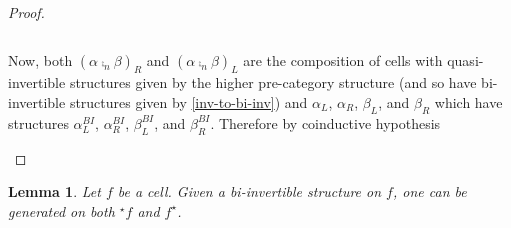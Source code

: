 \documentclass[draft]{article}
\newtheorem{lemma}[theorem]{Lemma} \theoremstyle{definition}
\newcommand{\linv}[1]{{}^\star\!#1} \newcommand{\rinv}[1]{#1^\star}
\begin{document}
\begin{proof}
\begin{itemize}
\begin{itemize}
\begin{equation*}
      \end{equation*}
    \end{itemize}
    Now, both \({(\alpha \comp_n \beta)}_R\) and \({(\alpha \comp_n
      \beta)}_L\) are the composition of cells with quasi-invertible
    structures given by the higher pre-category structure (and so have
    bi-invertible structures given by \cref{inv-to-bi-inv}) and
    \(\alpha_L\), \(\alpha_R\), \(\beta_L\), and \(\beta_R\) which
    have structures \(\alpha_L^{BI}\), \(\alpha_R^{BI}\),
    \(\beta_L^{BI}\), and \(\beta_R^{BI}\). Therefore by coinductive
    hypothesis
  \end{itemize}
\end{proof}

\begin{lemma}\label{inverses}
  Let \(f\) be a cell. Given a bi-invertible structure on \(f\), one
  can be generated on both \(\linv f\) and \(\rinv f\).
\end{lemma}
\end{document}
